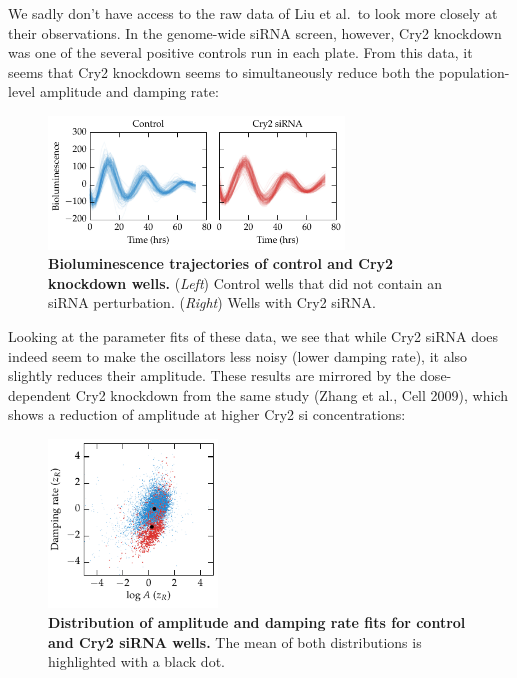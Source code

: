 \documentclass[11pt, letterpaper]{article}
\begin{document}
We sadly don't have access to the raw data of Liu et al.\ to look more closely at their observations. In the genome-wide siRNA screen, however, Cry2 knockdown was one of the several positive controls run in each plate.
From this data, it seems that Cry2 knockdown seems to simultaneously reduce both the population-level amplitude and damping rate:

\begin{figure}[h!]
  \begin{center}
    \includegraphics[width=0.7\textwidth]{response_figs/cry2_ts.pdf}
  \end{center}
  \caption{{\bfseries Bioluminescence trajectories of control and Cry2 knockdown wells.} ({\itshape Left}) Control wells that did not contain an siRNA perturbation. ({\itshape Right}) Wells with Cry2 siRNA.}
\end{figure}

Looking at the parameter fits of these data, we see that while Cry2 siRNA does indeed seem to make the oscillators less noisy (lower damping rate), it also slightly reduces their amplitude. These results are mirrored by the dose-dependent Cry2 knockdown from the same study (Zhang et al., Cell 2009), which shows a reduction of amplitude at higher Cry2 si concentrations:
\clearpage

\begin{figure}[h!]
  \begin{center}
    \includegraphics[width=0.4\textwidth]{response_figs/cry2_dist.pdf}
  \end{center}
  \caption{{\bfseries Distribution of amplitude and damping rate fits for control and Cry2 siRNA wells.} The mean of both distributions is highlighted with a black dot.}
\end{figure}
\end{document}
